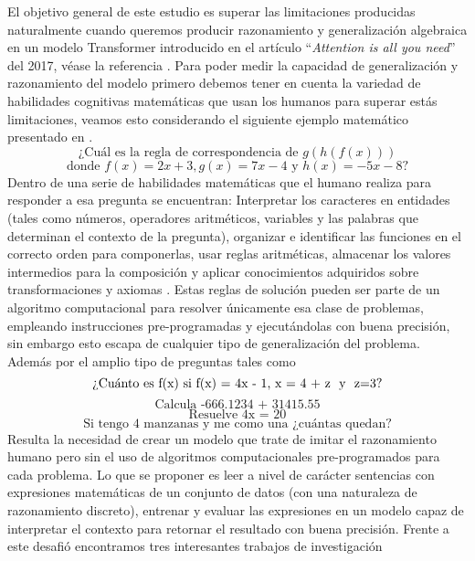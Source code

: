 \documentclass[conference]{IEEEtran}
\begin{document}
El objetivo general de este estudio es superar las limitaciones producidas naturalmente cuando queremos producir razonamiento y generalización algebraica en un modelo Transformer introducido en el artículo  \enquote{\textit{Attention is all you need}} del 2017, véase la referencia \cite{b4}. Para poder medir la capacidad de generalización y razonamiento del modelo primero debemos tener en cuenta la variedad de habilidades cognitivas matemáticas que usan los humanos para superar estás limitaciones, veamos esto considerando el siguiente ejemplo matemático presentado en \cite{b3}. 
\textit{$$\text{¿Cuál es la regla de correspondencia de } g(h(f(x)))$$
$$ \text{donde } f(x)= 2x+3, g(x)=7x-4 \text{ y } h(x)=-5x-8 \text{?}$$}
Dentro de una serie de habilidades matemáticas que el humano realiza para responder a esa pregunta se encuentran: Interpretar los caracteres en entidades (tales como números, operadores aritméticos, variables y las palabras que determinan el contexto de la pregunta), organizar e identificar las funciones en el correcto orden para componerlas, usar reglas aritméticas, almacenar los valores intermedios para la composición y aplicar conocimientos adquiridos sobre transformaciones y axiomas \cite{b3, b2}. Estas reglas de solución pueden ser parte de un algoritmo computacional para resolver únicamente esa clase de problemas, empleando instrucciones pre-programadas y ejecutándolas con buena precisión, sin embargo esto escapa de cualquier tipo de generalización del problema. Además por el amplio tipo de preguntas tales como 
\textit{$$\text{¿Cuánto es f(x) si f(x) = 4x - 1, x = 4 + z \text{ y } z=3?}$$
$$\text{Calcula -666.1234 + 31415.55}$$
$$\text{Resuelve 4x = 20}$$
$$\text{Si tengo 4 manzanas y me como una ¿cuántas quedan?}$$}
Resulta la necesidad de crear un modelo que trate de imitar el razonamiento humano pero sin el uso de algoritmos computacionales pre-programados para cada problema. Lo que se proponer es leer a nivel de carácter sentencias con expresiones matemáticas de un conjunto de datos (con una naturaleza de razonamiento discreto), entrenar y evaluar las expresiones en un modelo capaz de interpretar el contexto para retornar el resultado con buena precisión. Frente a este desafió encontramos tres interesantes trabajos de investigación
\end{document}
